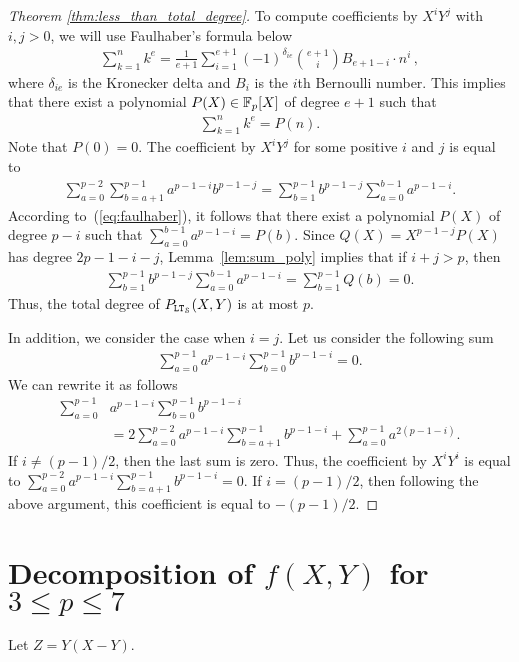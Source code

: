 \begin{proof}[Theorem \ref{thm:less_than_total_degree}]
    To compute coefficients by $X^i Y^j$ with $i, j > 0$, we will use Faulhaber's formula below
    \begin{align*}
      \sum_{k=1}^n k^e = \frac{1}{e+1} \sum_{i=1}^{e+1} (-1)^{\delta_{ie}} \binom{e+1}{i} B_{e+1-i} \cdot n^i\,,
    \end{align*}
    where $\delta_{ie}$ is the Kronecker delta and $B_{i}$ is the $i$th Bernoulli number.
    This implies that there exist a polynomial $P(X) \in \mathbb{F}_p[X]$ of degree $e+1$ such that
    \begin{align}\label{eq:faulhaber}
      \sum_{k=1}^n k^e = P(n).
    \end{align}
    Note that $P(0) = 0$.
    The coefficient by $X^i Y^j$ for some positive $i$ and $j$ is equal to
    \begin{align*}
      \sum_{a = 0}^{p-2} \sum_{b=a+1}^{p-1} a^{p-1-i} b^{p-1-j} = \sum_{b = 1}^{p-1} b^{p-1-j} \sum_{a=0}^{b-1} a^{p-1-i}.
    \end{align*}
    According to~(\ref{eq:faulhaber}), it follows that there exist a polynomial $P(X)$ of degree $p-i$ such that $\sum_{a=0}^{b-1} a^{p-1-i} = P(b)$.
    Since $Q(X) = X^{p-1-j} P(X)$ has degree $2p-1-i-j$, Lemma~\ref{lem:sum_poly} implies that if $i+j > p$, then
    \begin{align*}
      \sum_{b = 1}^{p-1} b^{p-1-j} \sum_{a=0}^{b-1} a^{p-1-i} = \sum_{b=1}^{p-1} Q(b) = 0.
    \end{align*}
    Thus, the total degree of $P_{\mathtt{LT}_{\mathcal{S}}}(X,Y)$ is at most $p$.

    In addition, we consider the case when $i = j$.
    Let us consider the following sum
    \begin{align*}
      \sum_{a=0}^{p-1} a^{p-1-i} \sum_{b=0}^{p-1} b^{p-1-i} = 0.
    \end{align*}
    We can rewrite it as follows
    \begin{align*}
      \sum_{a=0}^{p-1} & a^{p-1-i} \sum_{b=0}^{p-1} b^{p-1-i} \\
      &= 2\sum_{a=0}^{p-2} a^{p-1-i} \sum_{b=a+1}^{p-1} b^{p-1-i} + \sum_{a=0}^{p-1} a^{2(p-1-i)}.
    \end{align*}
    If $i \ne (p-1)/2$, then the last sum is zero.
    Thus, the coefficient by $X^i Y^i$ is equal to $\sum_{a=0}^{p-2} a^{p-1-i} \sum_{b=a+1}^{p-1} b^{p-1-i} = 0$.
    If $i = (p-1)/2$, then following the above argument, this coefficient is equal to $-(p-1)/2$.
  \end{proof}

\section{Decomposition of $f(X,Y)$ for $3\leq p \leq 7$}
\label{app:decomposition-f}
Let $Z = Y(X-Y)$.

